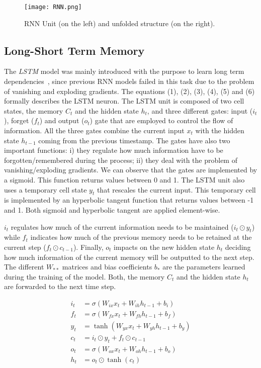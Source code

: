 \documentclass[journal, onecolumn]{IEEEtran}
\begin{document}
\begin{figure}[ht!]
\centering
\texttt{[image: RNN.png]}
\caption{RNN Unit (on the left) and unfolded structure (on the right). \label{fig:RNN}}
\end{figure}
\subsection{Long-Short Term Memory\label{sec:IRF} }


The \textit{LSTM} model was mainly introduced with the purpose to learn long term dependencies~\cite{HochreiterS96}, since previous RNN models failed in this task due to the problem of vanishing and exploding gradients. The equations (1), (2), (3), (4), (5) and (6) formally describes the LSTM neuron. 
The LSTM unit is composed of two cell states, the memory $C_t$ and the hidden state $h_t$, and three different gates:  input ($i_t$), forget ($f_t$) and output ($o_t$) gate that are employed to control the flow of information. All the three gates combine the current input $x_t$ with the hidden state $h_{t-1}$ coming from the previous timestamp.
The gates have also two important functions: i) they regulate how much information have to be forgotten/remembered during the process; ii) they deal with the problem of vanishing/exploding gradients. We can observe that the gates are implemented by a sigmoid. This function returns values between 0 and 1.
The LSTM unit also uses a temporary cell state $y_t$ that rescales the current input. 
This temporary cell is implemented by an hyperbolic tangent function that returns values between -1 and 1. Both sigmoid and hyperbolic tangent are applied element-wise.

$i_t$ regulates how much of the current information needs to be maintained ($i_t \odot y_t$) while $f_t$ indicates how much of the previous memory needs to be retained at the current step ($f_t \odot c_{t-1}$). Finally, $o_t$ impacts on the new hidden state $h_t$ deciding how much information of the current memory will be outputted to the next step. The different $W_{**}$ matrices and bias coefficients $b_{*}$ are the parameters learned during the training of the model. Both, the memory $C_t$ and the hidden state $h_t$ are forwarded to the next time step. 

\begin{align*}
i_{t} &= \sigma(W_{ix} x_{t} + W_{ih} h_{t-1} + b_i  ) \tag{1}\\
f_{t} &= \sigma(W_{fx} x_{t} + W_{fh} h_{t-1} + b_f  ) \tag{2}\\
y_{t} &= \tanh(W_{yx} x_{t} + W_{yh} h_{t-1} + b_y  )  \tag{3}\\
c_t &= i_t \odot y_t + f_t \odot c_{t-1}  \tag{4}\\
o_{t} &= \sigma(W_{ox} x_{t} + W_{oh} h_{t-1} + b_o  ) \tag{5}\\
h_t &= o_t \odot \tanh(c_t) \tag{6}
\end{align*}
\end{document}
